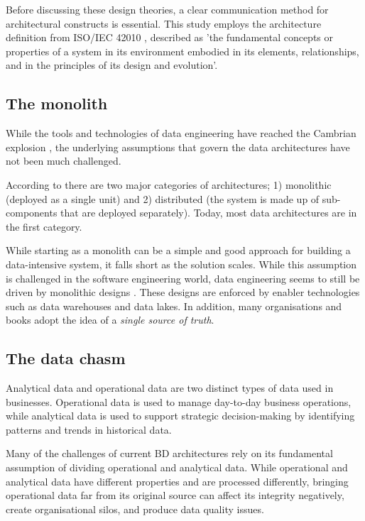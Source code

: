 \documentclass[preprint,12pt]{elsarticle}
\begin{document}
Before discussing these design theories, a clear communication method for architectural constructs is essential. This study employs the architecture definition from ISO/IEC 42010 \cite{ISO42010}, described as 'the fundamental concepts or properties of a system in its environment embodied in its elements, relationships, and in the principles of its design and evolution'.

\subsection{The monolith}

While the tools and technologies of data engineering have reached the Cambrian explosion \cite{AtaeiHype}, the underlying assumptions that govern the data architectures have not been much challenged.

According to \citeauthor{richards2020fundamentals} there are two major categories of architectures; 1) monolithic (deployed as a single unit) and 2) distributed (the system is made up of sub-components that are deployed separately). Today, most data architectures are in the first category. 

While starting as a monolith can be a simple and good approach for building a data-intensive system, it falls short as the solution scales. While this assumption is challenged in the software engineering world, data engineering seems to still be driven by monolithic designs \cite{ataei2022state}. These designs are enforced by enabler technologies such as data warehouses and data lakes. In addition, many organisations and books adopt the idea of a \emph{single source of truth}.

\subsection{The data chasm}

Analytical data and operational data are two distinct types of data used in businesses. Operational data is used to manage day-to-day business operations, while analytical data is used to support strategic decision-making by identifying patterns and trends in historical data.

Many of the challenges of current BD architectures rely on its fundamental assumption of dividing operational and analytical data. While operational and analytical data have different properties and are processed differently, bringing operational data far from its original source can affect its integrity negatively, create organisational silos, and produce data quality issues. 
\end{document}
